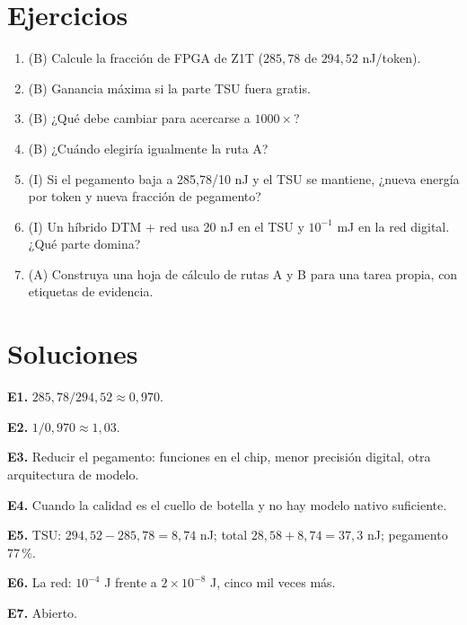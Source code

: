\documentclass[11pt,a4paper]{article}
\begin{document}
\section{Ejercicios}
\begin{enumerate}[label=\textbf{E\arabic*.}]
\item (B) Calcule la fracción de FPGA de Z1T ($285{,}78$ de $294{,}52$ nJ/token).
\item (B) Ganancia máxima si la parte TSU fuera gratis.
\item (B) ¿Qué debe cambiar para acercarse a $1000\times$?
\item (B) ¿Cuándo elegiría igualmente la ruta A?
\item (I) Si el pegamento baja a 285,78/10 nJ y el TSU se mantiene, ¿nueva energía por token y nueva fracción de pegamento?
\item (I) Un híbrido DTM + red usa 20 nJ en el TSU y $10^{-1}$ mJ en la red digital. ¿Qué parte domina?
\item (A) Construya una hoja de cálculo de rutas A y B para una tarea propia, con etiquetas de evidencia.
\end{enumerate}
\section{Soluciones}
\begin{solucion}
\textbf{E1.} $285{,}78/294{,}52\approx0{,}970$.

\textbf{E2.} $1/0{,}970\approx1{,}03$.

\textbf{E3.} Reducir el pegamento: funciones en el chip, menor precisión digital, otra arquitectura de modelo.

\textbf{E4.} Cuando la calidad es el cuello de botella y no hay modelo nativo suficiente.

\textbf{E5.} TSU: $294{,}52-285{,}78=8{,}74$ nJ; total $28{,}58+8{,}74=37{,}3$ nJ; pegamento $77\,\%$.

\textbf{E6.} La red: $10^{-4}$ J frente a $2\times10^{-8}$ J, cinco mil veces más.

\textbf{E7.} Abierto.
\end{solucion}
\end{document}
